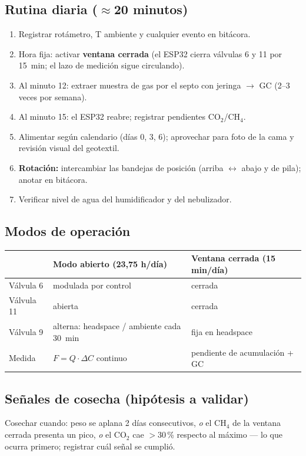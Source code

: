 \documentclass[11pt,a4paper]{article}
\begin{document}
\subsection{Rutina diaria (${\approx}$20 minutos)}
\begin{enumerate}
  \item Registrar rotámetro, T ambiente y cualquier evento en bitácora.
  \item Hora fija: activar \textbf{ventana cerrada} (el ESP32 cierra válvulas
        6 y 11 por 15~min; el lazo de medición sigue circulando).
  \item Al minuto 12: extraer muestra de gas por el septo con jeringa
        $\rightarrow$ GC (2--3 veces por semana).
  \item Al minuto 15: el ESP32 reabre; registrar pendientes CO$_2$/CH$_4$.
  \item Alimentar según calendario (días 0, 3, 6); aprovechar para foto de la
        cama y revisión visual del geotextil.
  \item \textbf{Rotación:} intercambiar las bandejas de posición (arriba
        $\leftrightarrow$ abajo y de pila); anotar en bitácora.
  \item Verificar nivel de agua del humidificador y del nebulizador.
\end{enumerate}

\subsection{Modos de operación}
\begin{center}
\begin{tabular}{@{}p{2.6cm}p{5.4cm}p{5.4cm}@{}}
\toprule
& \textbf{Modo abierto (23,75 h/día)} & \textbf{Ventana cerrada (15 min/día)} \\
\midrule
Válvula 6 & modulada por control & cerrada \\
Válvula 11 & abierta & cerrada \\
Válvula 9 & alterna: headspace / ambiente cada 30~min & fija en headspace \\
Medida & $F = Q \cdot \Delta C$ continuo & pendiente de acumulación + GC \\
\bottomrule
\end{tabular}
\end{center}

\subsection{Señales de cosecha (hipótesis a validar)}
Cosechar cuando: peso se aplana 2 días consecutivos, \emph{o} el CH$_4$ de la
ventana cerrada presenta un pico, \emph{o} el CO$_2$ cae $>$30\,\% respecto al
máximo --- lo que ocurra primero; registrar cuál señal se cumplió.
\end{document}
